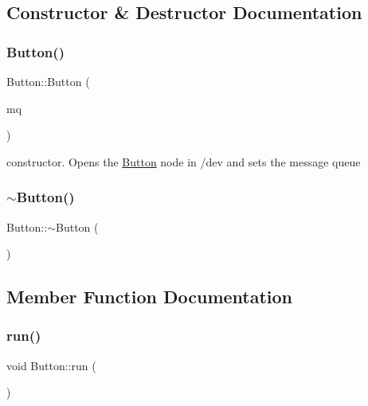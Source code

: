 \subsection{Constructor \& Destructor Documentation}
\mbox{\label{class_button_ad578f9ff8accb8a05c433da08adc0981}} 
\subsubsection{\texorpdfstring{Button()}{Button()}}
{\footnotesize\ttfamily Button\+::\+Button (\begin{DoxyParamCaption}\item[{osapi\+::\+Msg\+Queue $\ast$}]{mq }\end{DoxyParamCaption})}



constructor. Opens the \hyperlink{class_button}{Button} node in /dev and sets the message queue 

\mbox{\label{class_button_a2a001eb9c3cc8ae54768a850dd345002}} 
\subsubsection{\texorpdfstring{$\sim$\+Button()}{~Button()}}
{\footnotesize\ttfamily Button\+::$\sim$\+Button (\begin{DoxyParamCaption}{ }\end{DoxyParamCaption})}



\subsection{Member Function Documentation}
\mbox{\label{class_button_ae5f1226094e45cf814d000dab00593fe}} 
\subsubsection{\texorpdfstring{run()}{run()}}
{\footnotesize\ttfamily void Button\+::run (\begin{DoxyParamCaption}{ }\end{DoxyParamCaption})\hspace{0.3cm}{\ttfamily [private]}}

